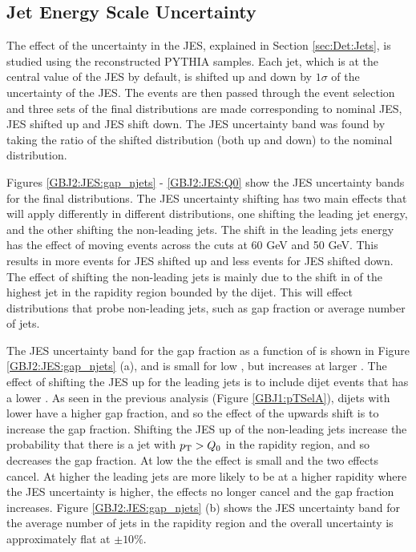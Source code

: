 \subsection{Jet Energy Scale Uncertainty}

The effect of the uncertainty in the JES, explained in Section \ref{sec:Det:Jets}, is studied using the reconstructed PYTHIA samples.
Each jet, which is at the central value of the JES by default, is shifted up and down by $1 \sigma$ of the uncertainty of the JES.
The events are then passed through the event selection and three sets of the final distributions are made corresponding to nominal JES,  JES shifted up and JES shift down.
The JES uncertainty band was found by taking the ratio of the shifted distribution (both up and down) to the nominal distribution.


Figures \ref{GBJ2:JES:gap_njets} - \ref{GBJ2:JES:Q0} show the JES uncertainty bands for the final distributions.
The JES uncertainty shifting has two main effects that will apply differently in different distributions, one shifting the leading jet energy, and the other shifting the non-leading jets.
The shift in the leading jets energy has the effect of moving events across the \pt{} cuts at 60 GeV and 50 GeV.
This results in more events for JES shifted up and less events for JES shifted down. 
The effect of shifting the non-leading jets is mainly due to the shift in \pt{} of the highest \pt{} jet in the rapidity region bounded by the dijet. 
This will effect distributions that probe non-leading jets, such as gap fraction or average number of jets. 

The JES uncertainty band for the gap fraction as a function of \dy{} is shown in Figure \ref{GBJ2:JES:gap_njets} (a), and is small for low \dy{}, but increases at larger \dy{}.
The effect of shifting the JES up for the leading jets is to include dijet events that has a lower \ptb{}. 
As seen in the previous analysis (Figure \ref{GBJ1:pTSelA}), dijets with lower \ptb{} have a higher gap fraction, and so the effect of the upwards shift is to increase the gap fraction.
Shifting the JES up of the non-leading jets increase the probability that there is a jet with $\mbox{$p_{\rm T}$}{}>Q_0$ in the rapidity region, and so decreases the gap fraction. 
At low \dy{} the the effect is small and the two effects cancel.
At higher \dy{} the leading jets are more likely to be at a higher rapidity where the JES uncertainty is higher, the effects no longer cancel and the gap fraction increases.
Figure \ref{GBJ2:JES:gap_njets} (b) shows the JES uncertainty band for the average number of jets in the rapidity region and the overall uncertainty is approximately flat at $\pm 10 \%$.



